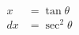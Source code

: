 \documentclass[preview]{standalone}
\begin{document}
\begin{align*}
x&=\tan\theta \\ dx&=\sec^2\theta
\end{align*}
\end{document}
